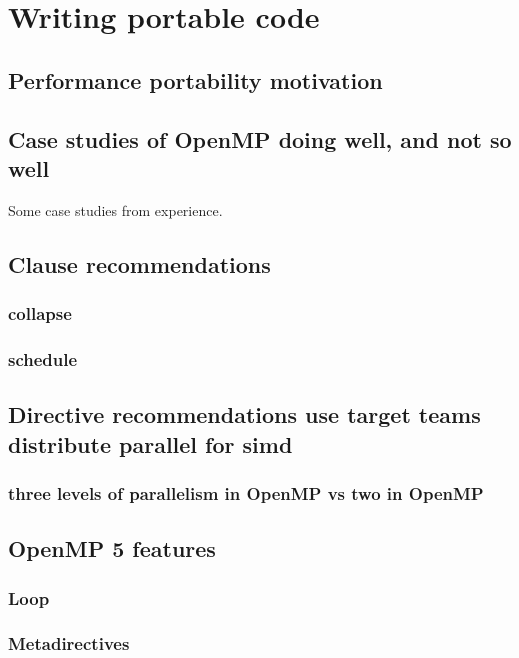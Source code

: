 

\chapter{Writing portable code}
\label{chapter:portable}

\section{Performance portability motivation}
\section{Case studies of OpenMP doing well, and not so well}
Some case studies from experience.

\section{Clause recommendations}
\subsection{collapse}
\subsection{schedule}

\section{Directive recommendations use target teams distribute parallel for simd}
\subsection{three levels of parallelism in OpenMP vs two in OpenMP}

\section{OpenMP 5 features}
\subsection{Loop}
\subsection{Metadirectives}
